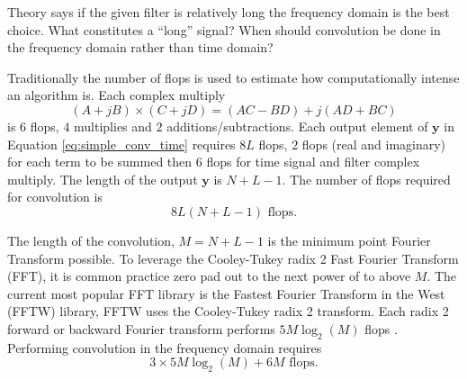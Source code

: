 Theory says if the given filter is relatively long the frequency domain is the best choice.
What constitutes a ``long'' signal?
When should convolution be done in the frequency domain rather than time domain?


Traditionally the number of flops is used to estimate how computationally intense an algorithm is. 
Each complex multiply 
\begin{equation}
(A+jB)\times(C+jD) = (AC-BD)+j(AD+BC)
\end{equation}
is $6$ flops, $4$ multiplies and $2$ additions/subtractions.
Each output element of $\mathbf{y}$ in Equation \eqref{eq:simple_conv_time} requires $8L$ flops, $2$ flops (real and imaginary) for each term to be summed then $6$ flops for time signal and filter complex multiply.
The length of the output $\mathbf{y}$ is $N+L-1$.
The number of flops required for convolution is
\begin{equation}
8L(N+L-1) \text{ flops}.
\label{eq:flops_time_domain_conv}
\end{equation}

The length of the convolution, $M=N+L-1$ is the minimum point Fourier Transform possible.
To leverage the Cooley-Tukey radix 2 Fast Fourier Transform (FFT), it is common practice zero pad out to the next power of to above $M$.
The current most popular FFT library is the Fastest Fourier Transform in the West (FFTW) library, FFTW uses the Cooley-Tukey radix 2 transform.
Each radix 2 forward or backward Fourier transform performs $5M\log_2(M)$ flops \cite{FFTW:2017,cooley1965algorithm}.
Performing convolution in the frequency domain requires
\begin{equation}
3\times5M\log_2(M)+6M \text{ flops}.
\label{eq:flops_freq_domain_conv}
\end{equation}


